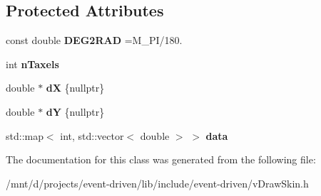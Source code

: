 \subsection*{Protected Attributes}
\begin{DoxyCompactItemize}
\item 
\mbox{\label{classev_1_1PAD_a337eaa97ea7673ac50a85ca45b3b9f4c}} 
const double {\bfseries D\+E\+G2\+R\+AD} =M\+\_\+\+PI/180.
\item 
\mbox{\label{classev_1_1PAD_aa1ef226653e839ac1a5087770cc2be7f}} 
int {\bfseries n\+Taxels}
\item 
\mbox{\label{classev_1_1PAD_ae3afe0ce63f749f004f2a33f6f3e34d7}} 
double $\ast$ {\bfseries dX} \{nullptr\}
\item 
\mbox{\label{classev_1_1PAD_ae2c6e5d2357e40c73a48e22bd9c558a2}} 
double $\ast$ {\bfseries dY} \{nullptr\}
\item 
\mbox{\label{classev_1_1PAD_af9ca2f32dd78d1242658aa49a99b7998}} 
std\+::map$<$ int, std\+::vector$<$ double $>$ $>$ {\bfseries data}
\end{DoxyCompactItemize}


The documentation for this class was generated from the following file\+:\begin{DoxyCompactItemize}
\item 
/mnt/d/projects/event-\/driven/lib/include/event-\/driven/v\+Draw\+Skin.\+h\end{DoxyCompactItemize}
